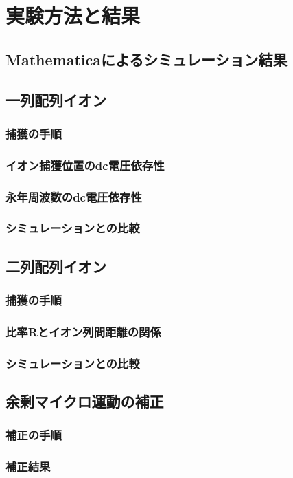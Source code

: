 \chapter{実験方法と結果}
\section{Mathematicaによるシミュレーション結果}
\section{一列配列イオン}
\subsection{捕獲の手順}
\subsection{イオン捕獲位置のdc電圧依存性}
\subsection{永年周波数のdc電圧依存性}
\subsection{シミュレーションとの比較}
\section{二列配列イオン}
\subsection{捕獲の手順}
\subsection{比率Rとイオン列間距離の関係}
\subsection{シミュレーションとの比較}

\section{余剰マイクロ運動の補正}
\subsection{補正の手順}
\subsection{補正結果}